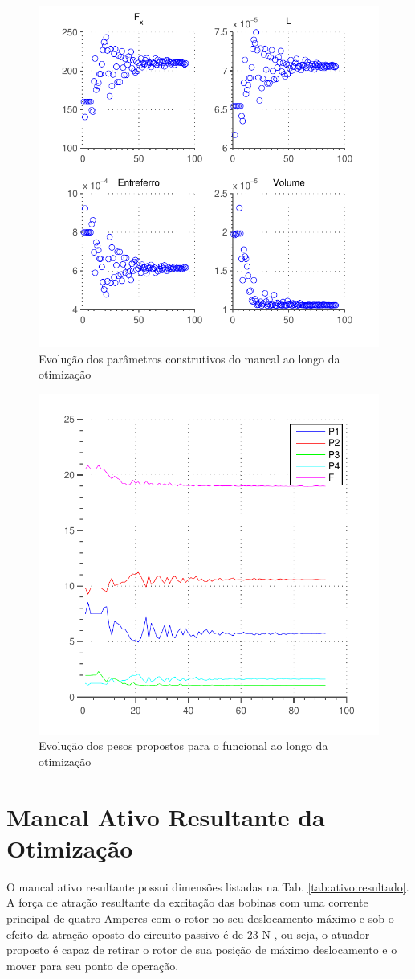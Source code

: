 \begin{figure}[ht!]
	\centering
	\includegraphics[width=0.6\linewidth]{Figs/Simulacoes/Ativo/otimizacao_ativo_parametros}
	\caption{Evolução dos parâmetros construtivos do mancal ao longo da otimização}
	\label{fig:otimizacao_ativo_parametros}
\end{figure}

\begin{figure}[ht!]
\centering
\includegraphics[width=0.6\linewidth]{Figs/Simulacoes/Ativo/otimizacao_ativo_pesos}
\caption{Evolução dos pesos propostos para o funcional ao longo da otimização}
\label{fig:otimizacao_ativo_pesos}
\end{figure}


\section{Mancal Ativo Resultante da Otimização}

O mancal ativo resultante possui dimensões listadas na Tab. \ref{tab:ativo:resultado}. A força de atração resultante da excitação das bobinas com uma corrente principal de quatro Amperes com o rotor no seu deslocamento máximo e sob o efeito da atração oposto do circuito passivo é de 23 N , ou seja, o atuador proposto é capaz de retirar o rotor de sua posição de máximo deslocamento e o mover para seu ponto de operação.

